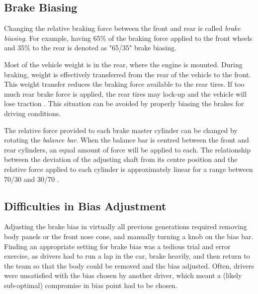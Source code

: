 \subsection{Brake Biasing}

Changing the relative braking force between the front and rear is called \emph{brake biasing}. For example, having 65\% of the braking force applied to the front wheels and 35\% to the rear is denoted as "65/35" brake biasing. 

Most of the vehicle weight is in the rear, where the engine is mounted. During braking, weight is effectively transferred from the rear of the vehicle to the front. This weight transfer reduces the braking force available to the rear tires. If too much rear brake force is applied, the rear tires may lock-up and the vehicle will lose traction \cite{FundVehicleDynamics}. This situation can be avoided by properly biasing the brakes for driving conditions.

The relative force provided to each brake master cylinder can be changed by rotating the \emph{balance bar}. When the balance bar is centred between the front and rear cylinders, an equal amount of force will be applied to each. The relationship between the deviation of the adjusting shaft from its centre position and the relative force applied to each cylinder is approximately linear for a range between 70/30 and 30/70 \cite{TiltonBrakeBias}. 

\subsection{Difficulties in Bias Adjustment}

Adjusting the brake bias in virtually all previous generations required removing body panels or the front nose cone, and manually turning a knob on the bias bar. Finding an appropriate setting for brake bias was a tedious trial and error exercise, as drivers had to run a lap in the car, brake heavily, and then return to the team so that the body could be removed and the bias adjusted. Often, drivers were unsatisfied with the bias chosen by another driver, which meant a (likely sub-optimal) compromise in bias point had to be chosen.
